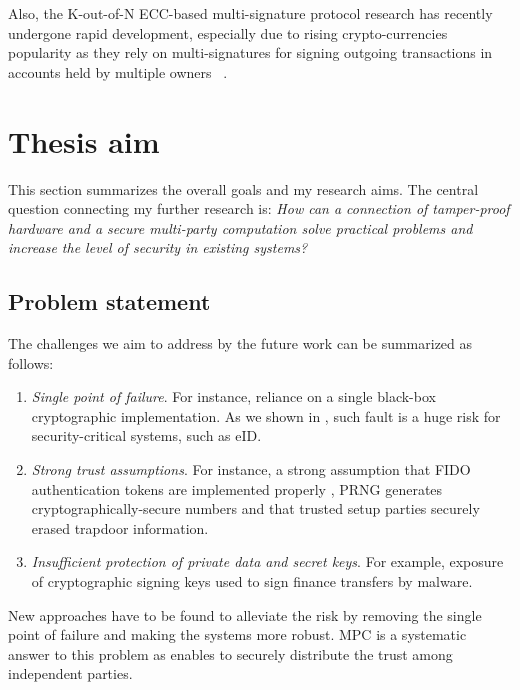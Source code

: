 \documentclass[
  digital, %
  twoside, %
  table,   %
  lof,     %
  lot,     %
]{fithesis3}
\newcounter{ph4_show_guides}
\theoremstyle{definition}
\theoremstyle{remark}
\begin{document}
\begin{ecmmnt} %
Also, the K-out-of-N ECC-based multi-signature protocol research has recently undergone rapid development, especially due to rising crypto-currencies popularity as they rely on multi-signatures for signing outgoing transactions in accounts held by multiple owners ~\cite{Bellare:2007:UAS:2394539.2394589, Bnz2017BulletproofsSP, cryptoeprint:2018:068}. 
\end{ecmmnt}



\chapter{Thesis aim}\label{sec:aim}
This section summarizes the overall goals and my research aims.
The central question connecting my further research is: \emph{How can a connection of tamper-proof hardware and a secure multi-party computation solve practical problems and increase the level of security in existing systems?}

\section{Problem statement}
The challenges we aim to address by the future work can be summarized as follows:

\begin{enumerate}
	\item \emph{Single point of failure}. For instance, reliance on a single black-box cryptographic implementation. As we shown in \cite{2017-ccs-nemec}, such fault is a huge risk for security-critical systems, such as eID.
	
	\item \emph{Strong trust assumptions}. For instance, a strong assumption that FIDO authentication tokens are implemented properly \cite{DCMBR18}, PRNG generates cryptographically-secure numbers and that trusted setup parties securely erased trapdoor information.
	
	\item \emph{Insufficient protection of private data and secret keys}. 
	For example, exposure of cryptographic signing keys used to sign finance transfers by malware.
\end{enumerate}
 
New approaches have to be found to alleviate the risk by removing the single point of failure and making the systems more robust. MPC is a systematic answer to this problem as enables to securely distribute the trust among independent parties.
\end{document}
